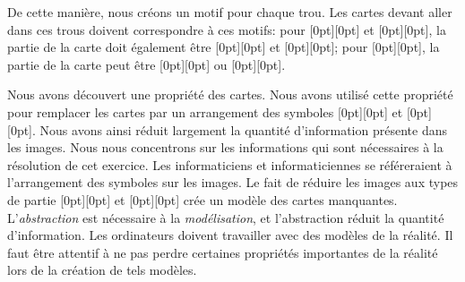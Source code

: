{{De cette manière, nous créons un motif pour chaque trou. Les cartes devant aller dans ces trous doivent correspondre à ces motifs: pour \raisebox{-0.5ex}[0pt][0pt]{} et \raisebox{-0.5ex}[0pt][0pt]{}, la partie de la carte doit également être \raisebox{-0.5ex}[0pt][0pt]{} et \raisebox{-0.5ex}[0pt][0pt]{}; pour \raisebox{-0.5ex}[0pt][0pt]{}, la partie de la carte peut être \raisebox{-0.5ex}[0pt][0pt]{} ou \raisebox{-0.5ex}[0pt][0pt]{}.

Nous avons découvert une propriété des cartes. Nous avons utilisé cette propriété pour remplacer les cartes par un arrangement des symboles \raisebox{-0.5ex}[0pt][0pt]{} et \raisebox{-0.5ex}[0pt][0pt]{}. Nous avons ainsi réduit largement la quantité d’information présente dans les images. Nous nous concentrons sur les informations qui sont nécessaires à la résolution de cet exercice. Les informaticiens et informaticiennes se référeraient à l’arrangement des symboles sur les images. Le fait de réduire les images aux types de partie \raisebox{-0.5ex}[0pt][0pt]{} et \raisebox{-0.5ex}[0pt][0pt]{} crée un modèle des cartes manquantes. L’\emph{abstraction} est nécessaire à la \emph{modélisation}, et l’abstraction réduit la quantité d’information. Les ordinateurs doivent travailler avec des modèles de la réalité. Il faut être attentif à ne pas perdre certaines propriétés importantes de la réalité lors de la création de tels modèles.



}}
